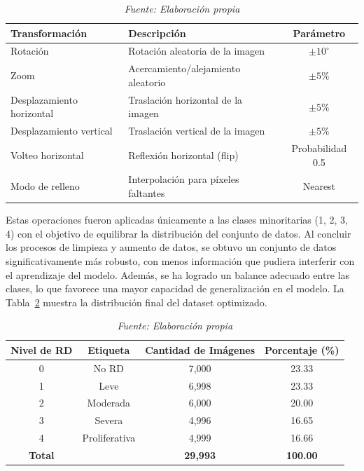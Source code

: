 \begin{table}[H]
\centering
\renewcommand{\arraystretch}{1.3}
\caption{Configuración de transformaciones de aumento de datos aplicadas}
\label{tab:data-augmentation}
\begin{tabularx}{\textwidth}{l X c}
\hline
\textbf{Transformación} & \textbf{Descripción} & \textbf{Parámetro} \\ \hline
Rotación & Rotación aleatoria de la imagen & $\pm 10^\circ$ \\
Zoom & Acercamiento/alejamiento aleatorio & $\pm 5\%$ \\
Desplazamiento horizontal & Traslación horizontal de la imagen & $\pm 5\%$ \\
Desplazamiento vertical & Traslación vertical de la imagen & $\pm 5\%$ \\
Volteo horizontal & Reflexión horizontal (flip) & Probabilidad 0.5 \\
Modo de relleno & Interpolación para píxeles faltantes & Nearest \\ \hline
\end{tabularx}
\caption*{\textit{Fuente: Elaboración propia}}
\end{table}

Estas operaciones fueron aplicadas únicamente a las clases minoritarias (1, 2, 3, 4) con 
el objetivo de equilibrar la distribución del conjunto de datos. Al concluir los procesos 
de limpieza y aumento de datos, se obtuvo un conjunto de datos significativamente más 
robusto, con menos información que pudiera interferir con el aprendizaje del modelo. 
Además, se ha logrado un balance adecuado entre las clases, lo que favorece una mayor 
capacidad de generalización en el modelo. La Tabla~\ref{tab:clases_aumentadas} muestra la 
distribución final del dataset optimizado.

\begin{table}[H]
	\centering
	\renewcommand{\arraystretch}{1.5}
	\caption{Distribución de clases en el conjunto de datos aumentado y balanceado}
	\label{tab:clases_aumentadas}
	\begin{tabular}{c c c c}
		\hline
		\textbf{Nivel de RD} & \textbf{Etiqueta} & \textbf{Cantidad de Imágenes} 
& \textbf{Porcentaje (\%)} \\
		\hline
		0 & No RD & 7,000 & 23.33 \\
		1 & Leve & 6,998 & 23.33 \\
		2 & Moderada & 6,000 & 20.00 \\
		3 & Severa & 4,996 & 16.65 \\
		4 & Proliferativa & 4,999 & 16.66 \\
		\hline
		\textbf{Total} & & \textbf{29,993} & \textbf{100.00} \\
		\hline
	\end{tabular}
	\caption*{\textit{Fuente: Elaboración propia}}
\end{table}

